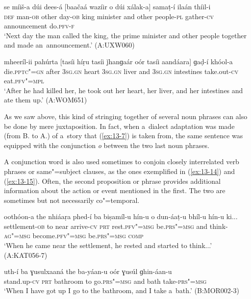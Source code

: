 \begin{exe}
\ex
\label{ex:13-12}
\gll se míiš-a dúi dees-á [baačaá wazíir o dúi xálak-a] samaṭ-í ilaán thíil-i \\
\textsc{def} man-\textsc{ob} other day-\textsc{ob} king minister and other  people-\textsc{pl} gather-\textsc{cv} announcement do.\textsc{pfv-f}  \\
\glt `Next day the man called the king, the prime minister and other people together and made an~announcement.' (A:UXW060)

\ex
\label{ex:13-13}
\gll mheeríl-ii pahúrta [tasíi híṛu tasíi ǰhanɡaár oór tasíi aandáara] ɡaḍ-í khóol-a  \\
die.\textsc{pptc"=gn} after \textsc{3sg.gn} heart \textsc{3sg.gn}  liver and \textsc{3sg.gn} intestines take.out-\textsc{cv} eat.\textsc{pfv"=mpl}\\
\glt `After he had killed her, he took out her heart, her liver, and her intestines and ate them up.' (A:WOM651) 
\end{exe}

As we saw above, this kind of stringing together of several noun phrases can also be done by mere juxtaposition. In fact, when a~dialect adaptation was made (from B. to A.) of a~story that (\ref{ex:13-7}) is taken from, the same sentence was equipped with the conjunction \textit{o} between the two last noun phrases. 


A conjunction word is also used sometimes to conjoin closely interrelated verb phrases or same"=subject clauses, as the ones exemplified in (\ref{ex:13-14}) and (\ref{ex:13-15}). Often, the second proposition or phrase provides additional information about the action or event mentioned in the first. The two are sometimes but not necessarily co"=temporal.

\begin{exe}
\ex
\label{ex:13-14}
\gll oothóon-a the nhiáaṛa phed-í ba biṣamíl-u hín-u o dun-áaṭ-u bhíl-u hín-u ki...\\
settlement-\textsc{ob} to near arrive-\textsc{cv} \textsc{prt} rest.\textsc{pfv"=msg} be.\textsc{prs"=msg} and think-\textsc{ag"=msg} become.\textsc{pfv"=msg} be.\textsc{prs"=msg } \textsc{comp} \\
\glt `When he came near the settlement, he rested and started to think...' (A:KAT056-7)

\ex
\label{ex:13-15}
\gll uth-í ba ɣusulxaaná the ba-yáan-u oór ɣusúl ɡhin-áan-u \\
stand.up-\textsc{cv} \textsc{prt} bathroom to go.\textsc{prs"=msg}  and bath take-\textsc{prs"=msg} \\
\glt `When I have got up I go to the bathroom, and I take a~bath.' (B:MOR002-3) 
\end{exe}

